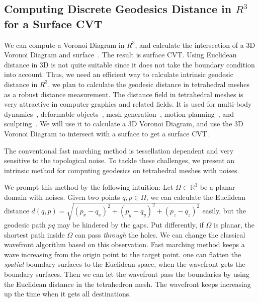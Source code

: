 \subsection{Computing Discrete Geodesics Distance in $R^3$ for a Surface CVT}
\label{subsec:DIG}

We can compute a Voronoi Diagram in $R^3$, and calculate
the intersection of a 3D Voronoi Diagram and surface~\cite{Liu:2009:CVT}.
 The result is surface CVT.
 Using Euclidean distance in 3D is not quite suitable since it does not
  take the boundary condition into
account. Thus, we need an efficient  way to calculate intrinsic geodesic
distance in $R^3$, we plan to calculate the geodesic
 distance in tetrahedral meshes as a robust distance measurement.
  The distance field in tetrahedral meshes
 is very attractive in computer graphics and related fields.
It is used for multi-body dynamics~\cite{guendelman2003nonconvex},
 deformable objects~\cite{fisher2001deformed}, 
 mesh generation~\cite{molino2003crystalline},
 motion planning~\cite{hoff1999fast}, 
 and sculpting~\cite{baerentzen2002manipulation}.
 We will use it to calculate a 3D Voronoi Diagram, and
 use the 3D Voronoi Diagram to intersect with a surface 
 to get a surface CVT.

The conventional fast marching method is tessellation dependent
and very sensitive to the topological noise.
To tackle these challenges, we present an intrinsic method for computing
geodesics on tetrahedral meshes with noises.

We prompt this method by the following
intuition: Let $\Omega\subset\mathbb{R}^{3}$ be a planar domain
with noises. Given two points $q, p\in \Omega$, we can
calculate the Euclidean distance
$d(q,p)=\sqrt{(p_x-q_x)^2+(p_y-q_y)^2+(p_z-q_z)^2}$ 
easily, but the geodesic path $pq$ may
be hindered by the gaps. Put differently, if $\Omega$ is
planar, the shortest path inside $\Omega$ can pass \textit{through}
the holes. We
can change the classical wavefront algorithm based on this observation.
Fast marching method keeps a wave increasing
from the origin point to the target point. 
one can flatten the \textit{spatial}
boundary surfaces to the Euclidean space, when the wavefront gets 
the boundary surfaces.
Then we can  let the wavefront pass the boundaries by using the
Euclidean distance in the tetrahedron mesh. The wavefront keeps
increasing up the time when it gets all destinations.

